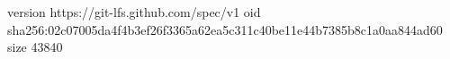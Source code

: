 version https://git-lfs.github.com/spec/v1
oid sha256:02c07005da4f4b3ef26f3365a62ea5c311c40be11e44b7385b8c1a0aa844ad60
size 43840
